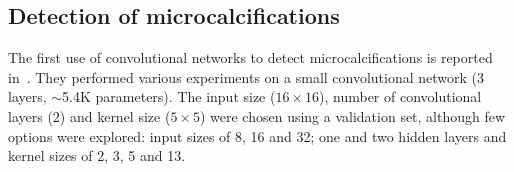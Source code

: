 \subsection{Detection of microcalcifications}
\begin{comment}
- detect microcalcifications
- only years after lecun showed it to be good on the mnist dataset.
- preselected images
- Background removal with wavelet high pass filtering ("a three-level wavelet transform was used and only the lowest frequency was eliminated for high-pass filtering before image reconstruction."). For lung nodules: Background removal like constrast enhancement.
- YES/NO output. For lung nodules: degrees of sensitivity in output(1-10) instead of disease/no disease . 
- Rotation and translation invariance. 0,90,180,270 and flipped over. (all of this on the small 32 by 32 images). No use of translation, it talks about it, though.
- Uses ROC/AUC.
- Each pixel represented 0.105 mm. (for instance 16 pixel input was 1.7mm)
- Same set used for validation and test
- using the data augmented versions one after the other in training gives better performance here (not sure why)
- 30-fold crossvalidation results reported (no test set): 0.89 AUC for individual miscrocalcifications and 0.97 for clustered microcalcif. 
- not quite clear if label were beningn/malign, microcalc/non-microcalc. It hink it is detection not diagonsis
- not clear how they measure the detection of microcalc. I think, of those microcalc detected from the normal algorithm if more than 3 were in the same 1 cm^2 area, it was considered as if the convnet detcted a cluster. 
- Easier to detect clusters these way because there could be 20 micorcalcif in a 1 cm^2 area and it only needs to detect 3.
- Bunch of questions on how on hell is this done. It could be done in a way that would help a lot the results, maybe that is why they have 0.97 AUC
\end{comment}
The first use of convolutional networks to detect microcalcifications is reported in~\cite{Lo1995}. They performed various experiments on a small convolutional network (3 layers, $\sim$5.4K parameters). The input size ($16\times 16$), number of convolutional layers ($2$) and kernel size ($5\times5$) were chosen using a validation set, although few options were explored: input sizes of 8, 16 and 32; one and two hidden layers and kernel sizes of 2, 3, 5 and 13.
